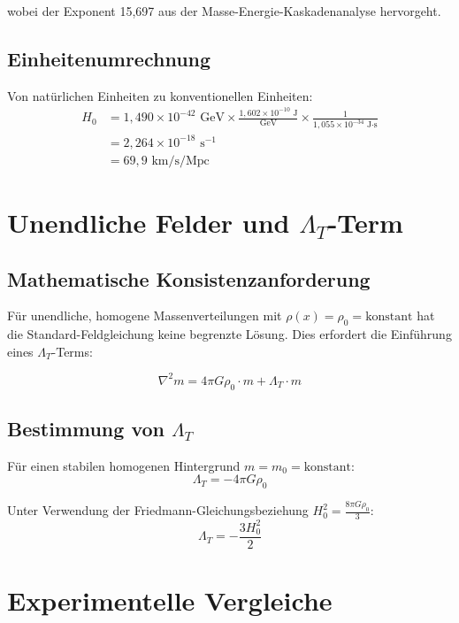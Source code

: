 \documentclass[12pt,a4paper]{article}
\begin{document}
	wobei der Exponent 15,697 aus der Masse-Energie-Kaskadenanalyse hervorgeht.
	
	\subsection{Einheitenumrechnung}
	Von natürlichen Einheiten zu konventionellen Einheiten:
	\begin{align}
		H_0 &= 1{,}490 \times 10^{-42} \text{ GeV} \times \frac{1{,}602 \times 10^{-10} \text{ J}}{\text{GeV}} \times \frac{1}{1{,}055 \times 10^{-34} \text{ J·s}} \\
		&= 2{,}264 \times 10^{-18} \text{ s}^{-1} \\
		&= 69{,}9 \text{ km/s/Mpc}
	\end{align}
	
	\section{Unendliche Felder und $\Lambda_T$-Term}
	
	\subsection{Mathematische Konsistenzanforderung}
	Für unendliche, homogene Massenverteilungen mit $\rho(x) = \rho_0 = \text{konstant}$ hat die Standard-Feldgleichung keine begrenzte Lösung. Dies erfordert die Einführung eines $\Lambda_T$-Terms:
	
	\begin{equation}
		\nabla^2 m = 4\pi G \rho_0 \cdot m + \Lambda_T \cdot m
	\end{equation}
	
	\subsection{Bestimmung von $\Lambda_T$}
	Für einen stabilen homogenen Hintergrund $m = m_0 = \text{konstant}$:
	\begin{equation}
		\Lambda_T = -4\pi G \rho_0
	\end{equation}
	
	Unter Verwendung der Friedmann-Gleichungsbeziehung $H_0^2 = \frac{8\pi G \rho_0}{3}$:
	\begin{equation}
		\Lambda_T = -\frac{3H_0^2}{2}
	\end{equation}
	
	\section{Experimentelle Vergleiche}
	
\end{document}
